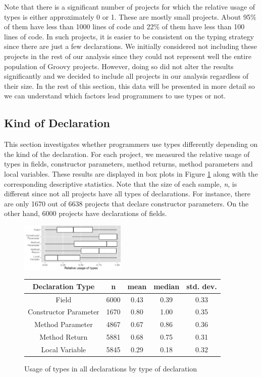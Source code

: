\documentclass[]{sigplanconf}
\renewcommand{\arraystretch}{1.2}
\begin{document}
Note that there is a significant number of projects for which the relative usage of types is either approximately 0 or 1.
These are mostly small projects.
About 95\% of them have less than 1000 lines of code and 22\% of them have less than 100 lines of code.
In such projects, it is easier to be consistent on the typing strategy since there are just a few declarations.
We initially considered not including these projects in the rest of our analysis since they could not represent well the entire population of Groovy projects.
However, doing so did not alter the results significantly and we decided to include all projects in our analysis regardless of their size.
In the rest of this section, this data will be presented in more detail so we can understand which factors lead programmers to use types or not.


\subsection{Kind of Declaration\label{sec:results-type}}
This section investigates whether programmers use types differently depending on the kind of the declaration.
For each project, we measured the relative usage of types in fields, constructor parameters, method returns, method parameters and local variables.
These results are displayed in box plots in Figure \ref{fig:all_boxplot_type} along with the corresponding descriptive statistics.
Note that the size of each sample, \emph{n}, is different since not all projects have all types of declarations. 
For instance, there are only 1670 out of 6638 projects that declare constructor parameters.
On the other hand, 6000 projects have declarations of fields.

\begin{figure}[h]
\centering 
\includegraphics[width=0.45\textwidth]{../analysis/result/all/boxplots/6_declarations_by_type.png} 
\vspace{0.3cm}

\renewcommand{\arraystretch}{1.2}
\small
\begin{tabular}{|c|c|c|c|c|}
\hline
Declaration Type		& n		& mean	& median		& std. dev.	\\
\hline
\hline
Field					& 6000	& 0.43	& 0.39		& 0.33		\\ \hline
Constructor Parameter	& 1670	& 0.80	& 1.00		& 0.35		\\ \hline
Method Parameter		& 4867	& 0.67	& 0.86		& 0.36		\\ \hline
Method Return			& 5881	& 0.68	& 0.75		& 0.31		\\ \hline
Local Variable			& 5845	& 0.29	& 0.18		& 0.32		\\ \hline
\end{tabular}

\caption{Usage of types in all declarations by type of declaration}
\label{fig:all_boxplot_type} 
\end{figure}
\end{document}
